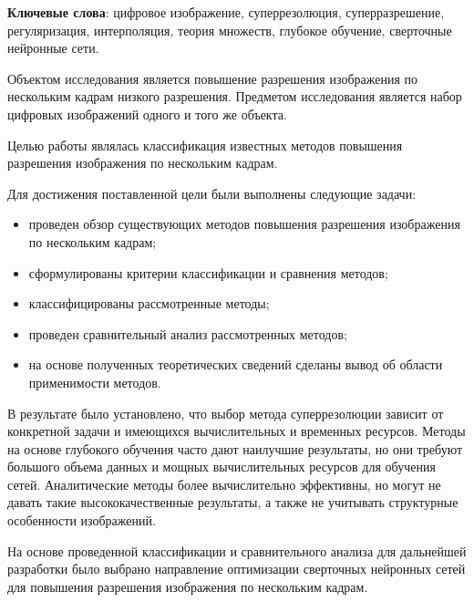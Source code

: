 \begin{essay}{}
    \noindent\textbf{Ключевые слова}: цифровое изображение, суперрезолюция, суперразрешение, регуляризация, интерполяция, теория множеств, глубокое обучение, сверточные нейронные сети.

    Объектом исследования является повышение разрешения изображения по нескольким кадрам низкого разрешения. Предметом исследования является набор цифровых изображений одного и того же объекта.
    
    Целью работы являлась классификация известных методов повышения разрешения изображения по нескольким кадрам.

    Для достижения поставленной цели были выполнены следующие задачи:

    \begin{itemize}
        \item проведен обзор существующих методов повышения разрешения изображения по нескольким кадрам;
        \item сформулированы критерии классификации и сравнения методов;
        \item классифицированы рассмотренные методы;
        \item проведен сравнительный анализ рассмотренных методов;
        \item на основе полученных теоретических сведений сделаны вывод об области применимости методов.
    \end{itemize}

    В результате было установлено, что выбор метода суперрезолюции зависит от конкретной задачи и имеющихся вычислительных и временных ресурсов. Методы на основе глубокого обучения часто дают наилучшие результаты, но они требуют большого объема данных и мощных вычислительных ресурсов для обучения сетей. Аналитические методы более вычислительно эффективны, но могут не давать такие высококачественные результаты, а также не учитывать структурные особенности изображений.

    На основе проведенной классификации и сравнительного анализа для дальнейшей разработки было выбрано направление оптимизации сверточных нейронных сетей для повышения разрешения изображения по нескольким кадрам.
    
\end{essay}